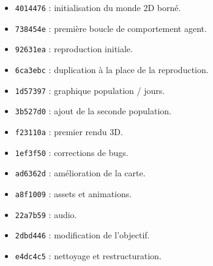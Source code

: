 ﻿\documentclass[11pt,a4paper]{article}
\begin{document}
\begin{itemize}[noitemsep]
  \item \texttt{4014476} : initialisation du monde 2D borné.
  \item \texttt{738454e} : première boucle de comportement agent.
  \item \texttt{92631ea} : reproduction initiale.
  \item \texttt{6ca3ebc} : duplication à la place de la reproduction.
  \item \texttt{1d57397} : graphique population / jours.
  \item \texttt{3b527d0} : ajout de la seconde population.
  \item \texttt{f23110a} : premier rendu 3D.
  \item \texttt{1ef3f50} : corrections de bugs.
  \item \texttt{ad6362d} : amélioration de la carte.
  \item \texttt{a8f1009} : assets et animations.
  \item \texttt{22a7b59} : audio.
  \item \texttt{2dbd446} : modification de l'objectif.
  \item \texttt{e4dc4c5} : nettoyage et restructuration.
\end{itemize}
\end{document}
